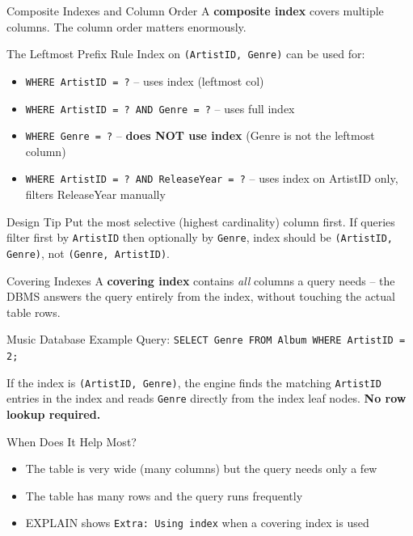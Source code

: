 \begin{frame}{Composite Indexes and Column Order}
  A \textbf{composite index} covers multiple columns.
  The column order matters enormously.

  \begin{block}{The Leftmost Prefix Rule}
    Index on \texttt{(ArtistID, Genre)} can be used for:
    \begin{itemize}
      \item \texttt{WHERE ArtistID = ?} \quad -- uses index (leftmost col)
      \item \texttt{WHERE ArtistID = ? AND Genre = ?} \quad -- uses full index
      \item \texttt{WHERE Genre = ?} \quad -- \textbf{does NOT use index}
            (Genre is not the leftmost column)
      \item \texttt{WHERE ArtistID = ? AND ReleaseYear = ?} \quad
            -- uses index on ArtistID only, filters ReleaseYear manually
    \end{itemize}
  \end{block}

  \begin{examples}{Design Tip}
    Put the most selective (highest cardinality) column first.
    If queries filter first by \texttt{ArtistID} then optionally by \texttt{Genre},
    index should be \texttt{(ArtistID, Genre)}, not \texttt{(Genre, ArtistID)}.
  \end{examples}
\end{frame}

\begin{frame}{Covering Indexes}
  A \textbf{covering index} contains \emph{all} columns a query needs --
  the DBMS answers the query entirely from the index, without touching the
  actual table rows.

  \begin{block}{Music Database Example}
    Query: \texttt{SELECT Genre FROM Album WHERE ArtistID = 2;}

    \medskip
    If the index is \texttt{(ArtistID, Genre)}, the engine finds the matching
    \texttt{ArtistID} entries in the index and reads \texttt{Genre} directly
    from the index leaf nodes. \textbf{No row lookup required.}
  \end{block}

  \begin{block}{When Does It Help Most?}
    \begin{itemize}
      \item The table is very wide (many columns) but the query needs only a few
      \item The table has many rows and the query runs frequently
      \item EXPLAIN shows \texttt{Extra: Using index} when a covering index is used
    \end{itemize}
  \end{block}
\end{frame}

